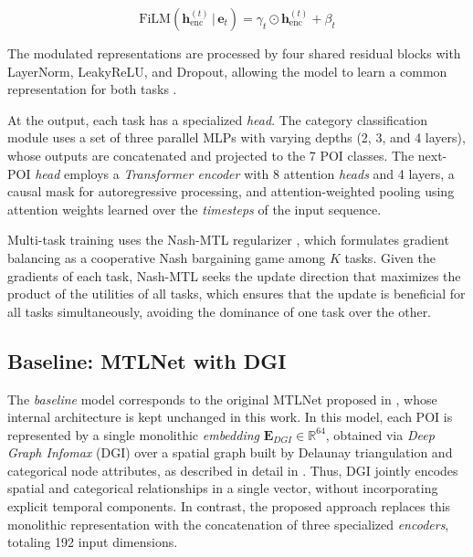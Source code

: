 \begin{equation}
\mathrm{FiLM}(\mathbf{h}_{\mathrm{enc}}^{(t)} \,|\, \mathbf{e}_{t}) = \gamma_{t} \odot \mathbf{h}_{\mathrm{enc}}^{(t)} + \beta_{t}
\label{eq:film}
\end{equation}

The modulated representations are processed by four shared residual blocks with LayerNorm, LeakyReLU, and Dropout, allowing the model to learn a common representation for both tasks \cite{baxter2000model}.

At the output, each task has a specialized \textit{head}. The category classification module uses a set of three parallel MLPs with varying depths (2, 3, and 4 layers), whose outputs are concatenated and projected to the 7 POI classes. The next-POI \textit{head} employs a \textit{Transformer encoder} with 8 attention \textit{heads} and 4 layers, a causal mask for autoregressive processing, and attention-weighted pooling using attention weights learned over the \textit{timesteps} of the input sequence. %

Multi-task training uses the Nash-MTL regularizer \cite{nash}, which formulates gradient balancing as a cooperative Nash bargaining game among $K$ tasks. Given the gradients of each task, Nash-MTL seeks the update direction that maximizes the product of the utilities of all tasks, which ensures that the update is beneficial for all tasks simultaneously, avoiding the dominance of one task over the other.



\subsection{Baseline: MTLNet with DGI}

The \textit{baseline} model corresponds to the original MTLNet proposed in \cite{silva2025mtlnet}, whose internal architecture is kept unchanged in this work. In this model, each POI is represented by a single monolithic \textit{embedding} $\mathbf{E}_{DGI} \in \mathbb{R}^{64}$, obtained via \textit{Deep Graph Infomax} (DGI) \cite{velickovic2019deep} over a spatial graph built by Delaunay triangulation and categorical node attributes, as described in detail in \cite{silva2025mtlnet}. Thus, DGI jointly encodes spatial and categorical relationships in a single vector, without incorporating explicit temporal components. In contrast, the proposed approach replaces this monolithic representation with the concatenation of three specialized \textit{encoders}, totaling 192 input dimensions.


